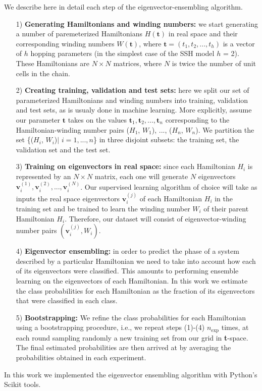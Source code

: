 \documentclass[fleqn,10pt]{wlscirep}
\begin{document}
We describe here in detail each step of the eigenvector-ensembling algorithm.
\vspace{.3cm}
\begin{enumerate}[topsep=0pt, partopsep=0pt]
\item[1)] \textbf{Generating Hamiltonians and winding numbers:} we start generating a number of paremeterized Hamiltonians $H(\mathbf{t})$ in real space and their corresponding winding numbers $W(\mathbf{t})$, where $\mathbf{t} = (t_1, t_2,...,t_h)$ is a vector of $h$ hopping parameters (in the simplest case of the SSH model $h$ = 2). These Hamiltonians are $N\times N$ matrices, where $N$ is twice the number of unit cells in the chain.
\item[2)] \textbf{Creating training, validation and test sets:} here we split our set of parameterized Hamiltonians and winding numbers into training, validation and test sets, as is usualy done in machine learning. More explicitly, assume our parameter $\mathbf{t}$ takes on the values $\mathbf{t}_1, \mathbf{t}_2, ..., \mathbf{t}_n$ corresponding to the Hamiltonian-winding number pairs ($H_1$, $W_1$), ..., ($H_n$, $W_n$). We partition the set \{($H_i$, $W_i$)$\mid$ $i=1,...,n$\} in three disjoint subsets: the training set, the validation set and the test set.
\item[3)] \textbf{Training on eigenvectors in real space:} since each Hamiltonian $H_i$ is represented by an $N\times N$ matrix, each one will generate $N$ eigenvectors $\mathbf{v}_i^{(1)}, \mathbf{v}_i^{(2)},...,\mathbf{v}_i^{(N)}$. Our supervised learning algorithm of choice will take as inputs the real space eigenvectors $\mathbf{v}^{(j)}_i$ of each Hamiltonian $H_i$ in the training set and be trained to learn the winding number $W_i$ of their parent Hamiltonian $H_i$. Therefore, our dataset will consist of eigenvector-winding number pairs $(\mathbf{v}_i^{(j)}, W_i)$.
\item[4)]\textbf{Eigenvector ensembling:} in order to predict the phase of a system described by a particular Hamiltonian we need to take into account how each of its eigenvectors were classified. This amounts to performing ensemble learning on the eigenvectors of each Hamiltonian. In this work we estimate the class probabilities for each Hamiltonian as the fraction of its eigenvectors that were classified in each class.
\item[5)] \textbf{Bootstrapping:} We refine the class probabilities for each Hamiltonian using a bootstrapping procedure, i.e., we repeat steps (1)-(4) $n_\text{exp}$ times, at each round sampling randomly a new training set from our grid in \textbf{t}-space. The final estimated probabilities are then arrived at by averaging the probabilities obtained in each experiment.
\end{enumerate}
\vspace{.3cm}
In this work we implemented the eigenvector ensembling algorithm with Python's Scikit tools.
\end{document}
